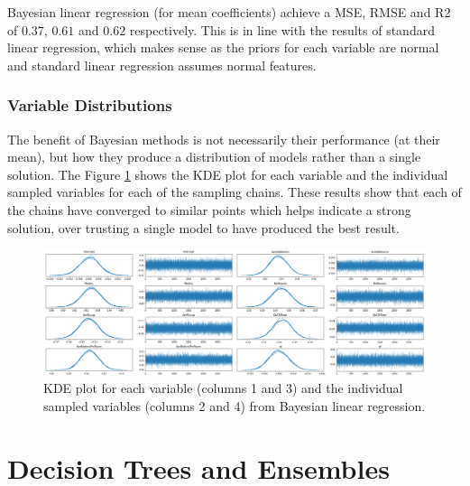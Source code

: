 \documentclass[11pt]{article}
\begin{document}
Bayesian linear regression (for mean coefficients) achieve a MSE, RMSE and R2 of $0.37$, $0.61$ and $0.62$ respectively. This is in line with the results of standard linear regression, which makes sense as the priors for each variable are normal and standard linear regression assumes normal features.

\subsubsection{Variable Distributions}

The benefit of Bayesian methods is not necessarily their performance (at their mean), but how they produce a distribution of models rather than a single solution. The Figure \ref{traceplot} shows the KDE plot for each variable and the individual sampled variables for each of the sampling chains. These results show that each of the chains have converged to similar points which helps indicate a strong solution, over trusting a single model to have produced the best result.

\begin{figure}[h]
    \label{traceplot}
    \centering
    \includegraphics[width=0.95\linewidth]{figures/03_bayesian_linear_regression/bayesian_regression_traceplot.png}
    \caption{KDE plot for each variable (columns 1 and 3) and the individual sampled variables (columns 2 and 4) from Bayesian linear regression.}
\end{figure}

\newpage


\section{Decision Trees and Ensembles}
\label{trees_ensembles}
\end{document}
